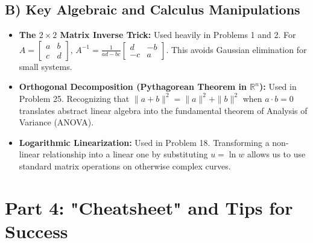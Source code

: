 \documentclass[11pt, letterpaper]{article}
\theoremstyle{definition}
\theoremstyle{remark}
\newcommand{\R}{\mathbb{R}}
\begin{document}
\subsection{B) Key Algebraic and Calculus Manipulations}
\begin{itemize}
    \item \textbf{The $2 \times 2$ Matrix Inverse Trick:} Used heavily in Problems 1 and 2. For $A = \begin{bmatrix} a & b \\ c & d \end{bmatrix}$, $A^{-1} = \frac{1}{ad-bc}\begin{bmatrix} d & -b \\ -c & a \end{bmatrix}$. This avoids Gaussian elimination for small systems.
    \item \textbf{Orthogonal Decomposition (Pythagorean Theorem in $\R^n$):} Used in Problem 25. Recognizing that $\|a+b\|^2 = \|a\|^2 + \|b\|^2$ when $a \cdot b = 0$ translates abstract linear algebra into the fundamental theorem of Analysis of Variance (ANOVA).
    \item \textbf{Logarithmic Linearization:} Used in Problem 18. Transforming a non-linear relationship into a linear one by substituting $u = \ln w$ allows us to use standard matrix operations on otherwise complex curves.
\end{itemize}

\newpage
\section{Part 4: "Cheatsheet" and Tips for Success}

\renewcommand{\arraystretch}{1.5}
\end{document}
